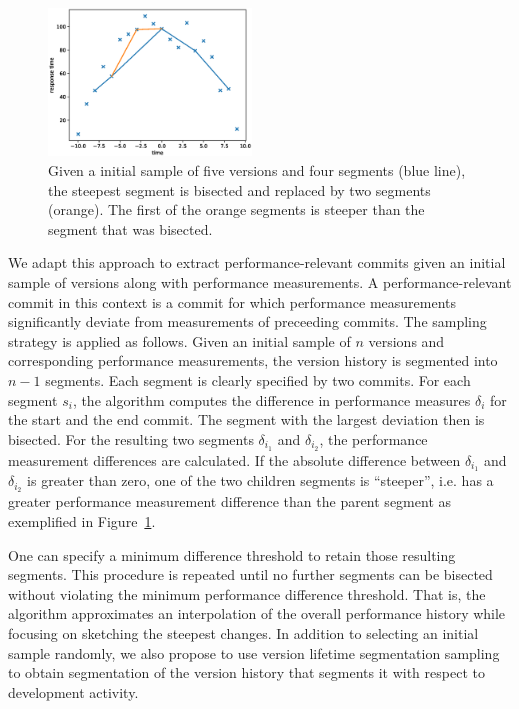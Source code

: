 \begin{figure}
 \begin{center}
   \vspace{-1cm}
   \includegraphics[width=0.48\textwidth]{images/inverse_douglas_peucker}
 \end{center}
 \caption{Given a initial sample of five versions and four segments (blue
 line), the steepest segment is bisected and replaced by two segments
 (orange).
The first of the orange segments is steeper than the segment that was
bisected. \label{fig:example_bisection}}
\end{figure}

We adapt this approach to extract performance-relevant commits given an initial
sample of versions along with performance measurements. A performance-relevant
commit in this context is a commit for which performance measurements
significantly deviate from measurements of preceeding commits. The sampling
strategy is applied as follows. Given an initial sample of $n$ versions and
corresponding performance measurements, the version history is segmented into
$n-1$ segments. Each segment is clearly specified by two commits. For each
segment $s_i$, the algorithm computes the difference in performance
 measures $\delta_i$ for the start and the end commit. The segment with the
 largest deviation then is bisected. For the resulting two segments $\delta_{i_1}$ and $\delta_{i_2}$, the performance measurement differences are calculated. If the
absolute difference between $\delta_{i_1}$ and  $\delta_{i_2}$ is greater than
zero, one of the two children segments is ``steeper'', i.e. has a greater
performance measurement difference than the parent segment as exemplified in
Figure~\ref{fig:example_bisection}.

One can specify a minimum difference threshold to retain those resulting
segments. This procedure is repeated until no further segments can be bisected without violating the
minimum performance difference threshold. That is, the algorithm approximates
an interpolation of the overall performance history while focusing on sketching
the steepest changes. In addition to selecting an initial sample randomly, we
also propose to use version lifetime segmentation sampling to obtain
segmentation of the version history that segments it with respect to development
activity.

